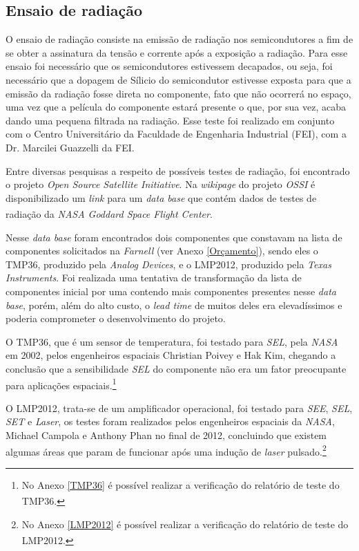\documentclass[
	12pt,				%
	openright,			%
	oneside,			%
	a4paper,			%
	english,			%
	french,				%
	spanish,			%
	brazil,				%
	oldfontcommands
	]{abntex2}
\begin{document}
\subsection[Ensaio de radiação]{Ensaio de radiação}	

	O ensaio de radiação consiste na emissão de radiação nos semicondutores a fim de se obter a assinatura da tensão e corrente após a exposição a radiação. Para esse ensaio foi necessário que os semicondutores estivessem decapados, ou seja, foi necessário que a dopagem de Sílicio do semicondutor estivesse exposta para que a emissão da radiação fosse direta no componente, fato que não ocorrerá no espaço, uma vez que a película do componente estará presente o que, por sua vez, acaba dando uma pequena filtrada na radiação. Esse teste foi realizado em conjunto com o Centro Universitário da Faculdade de Engenharia Industrial (FEI), com a Dr. Marcilei Guazzelli da FEI.
	
	Entre diversas pesquisas a respeito de possíveis testes de radiação, foi encontrado o projeto \textit{Open Source Satellite Initiative}. Na \textit{wikipage} do projeto \textit{OSSI} é disponibilizado um \textit{link} para um \textit{data base} que contém dados de testes de radiação da \textit{NASA Goddard Space Flight Center}.\textsuperscript{\cite{OSSI}}\textsuperscript{\cite{OSSI2}}\textsuperscript{\cite{OSSI3}}
	
	Nesse \textit{data base} foram encontrados dois componentes que constavam na lista de componentes solicitados na \textit{Farnell} (ver Anexo \ref{Orçamento}), sendo eles o TMP36, produzido pela \textit{Analog Devices}, e o LMP2012, produzido pela \textit{Texas Instruments}. Foi realizada uma tentativa de transformação da lista de componentes inicial por uma contendo mais componentes presentes nesse \textit{data base}, porém, além do alto custo, o \textit{lead time} de muitos deles era elevadíssimos e poderia comprometer o desenvolvimento do projeto.
	
	O TMP36, que é um sensor de temperatura, foi testado para \textit{SEL}, pela \textit{NASA} em 2002, pelos engenheiros espaciais Christian Poivey e Hak Kim, chegando a conclusão que a sensibilidade \textit{SEL} do componente não era um fator preocupante para aplicações espaciais.\footnote{No Anexo \ref{TMP36} é possível realizar a verificação do relatório de teste do TMP36.\textsuperscript{\cite{TMP36}}}
	
	O LMP2012, trata-se de um amplificador operacional, foi testado para \textit{SEE}, \textit{SEL}, \textit{SET} e \textit{Laser}, os testes foram realizados pelos engenheiros espaciais da \textit{NASA}, Michael Campola e Anthony Phan no final de 2012, concluindo que existem algumas áreas que param de funcionar após uma indução de \textit{laser} pulsado.\footnote{No Anexo \ref{LMP2012} é possível realizar a verificação do relatório de teste do LMP2012.\textsuperscript{\cite{LMP2012}}}
	
\end{document}
